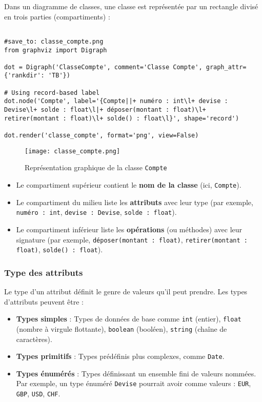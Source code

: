 \documentclass{article}
\begin{document}
Dans un diagramme de classes, une classe est représentée par un rectangle divisé en trois parties (compartiments) :

\begin{verbatim}

#save_to: classe_compte.png
from graphviz import Digraph

dot = Digraph('ClasseCompte', comment='Classe Compte', graph_attr={'rankdir': 'TB'})

# Using record-based label
dot.node('Compte', label='{Compte||+ numéro : int\l+ devise : Devise\l+ solde : float\l|+ déposer(montant : float)\l+ retirer(montant : float)\l+ solde() : float\l}', shape='record')

dot.render('classe_compte', format='png', view=False)

\end{verbatim}

\begin{figure}[h]
    \centering
    \texttt{[image: classe\_compte.png]}
    \caption{Représentation graphique de la classe \texttt{Compte}}
    \label{fig:classe_compte}
\end{figure}


\begin{itemize}
    \item Le compartiment supérieur contient le \textbf{nom de la classe} (ici, \texttt{Compte}).
    \item Le compartiment du milieu liste les \textbf{attributs} avec leur type (par exemple, \texttt{numéro : int}, \texttt{devise : Devise}, \texttt{solde : float}).
    \item Le compartiment inférieur liste les \textbf{opérations} (ou méthodes) avec leur signature (par exemple, \texttt{déposer(montant : float)}, \texttt{retirer(montant : float)}, \texttt{solde() : float}).
\end{itemize}

\subsubsection{Type des attributs}
Le type d'un attribut définit le genre de valeurs qu'il peut prendre. Les types d'attributs peuvent être :
\begin{itemize}
    \item \textbf{Types simples} : Types de données de base comme \texttt{int} (entier), \texttt{float} (nombre à virgule flottante), \texttt{boolean} (booléen), \texttt{string} (chaîne de caractères).
    \item \textbf{Types primitifs} : Types prédéfinis plus complexes, comme \texttt{Date}.
    \item \textbf{Types énumérés} : Types définissant un ensemble fini de valeurs nommées. Par exemple, un type énuméré \texttt{Devise} pourrait avoir comme valeurs : \texttt{EUR}, \texttt{GBP}, \texttt{USD}, \texttt{CHF}.
\end{itemize}
\end{document}
